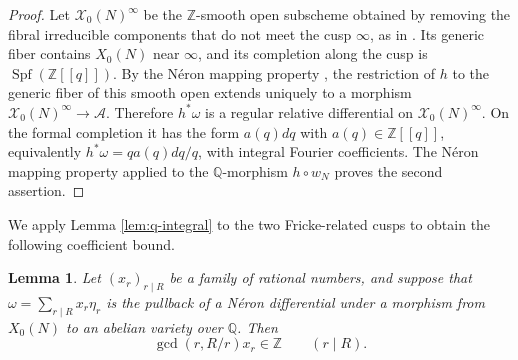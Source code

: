 \documentclass[12pt, letterpaper]{amsart}
\newtheorem{lemma}[theorem]{Lemma}
\theoremstyle{definition}
\theoremstyle{remark}
\newcommand{\Q}{\mathbb Q}
\newcommand{\Z}{\mathbb Z}
\numberwithin{equation}{section}
\begin{document}
\begin{proof}
Let \(\mathcal X_0(N)^\infty\) be the \(\Z\)-smooth open subscheme obtained by
removing the fibral irreducible components that do not meet the cusp \(\infty\),
as in \cite{CesnaviciusNeururerSaha}. Its generic fiber contains
\(X_0(N)\) near \(\infty\), and its completion along the cusp is
\(\operatorname{Spf}(\Z[[q]])\). By the N\'eron mapping property
\cite{BLR}, the restriction of \(h\) to the generic
fiber of this smooth open extends uniquely to a morphism
\(\mathcal X_0(N)^\infty\to\mathcal A\). Therefore \(h^*\omega\) is a regular
relative differential on \(\mathcal X_0(N)^\infty\). On the formal completion it
has the form \(a(q)dq\) with \(a(q)\in\Z[[q]]\), equivalently
\(h^*\omega=qa(q)dq/q\), with integral Fourier coefficients. The N\'eron
mapping property applied to the \(\Q\)-morphism \(h\circ w_N\)
proves the second assertion.
\end{proof}

We apply Lemma \ref{lem:q-integral} to the two Fricke-related cusps
to obtain the following coefficient bound.

\begin{lemma}\label{lem:two-cusp}
Let \((x_r)_{r\mid R}\) be a family of rational numbers, and suppose that
\(\omega=\sum_{r\mid R}x_r\eta_r\) is the pullback of a N\'eron differential
under a morphism from \(X_0(N)\) to an abelian variety over \(\Q\).
Then
\begin{equation}\label{eq:gcd-condition}
        \gcd(r,R/r)x_r\in\Z
        \qquad(r\mid R).
\end{equation}
\end{lemma}
\end{document}
